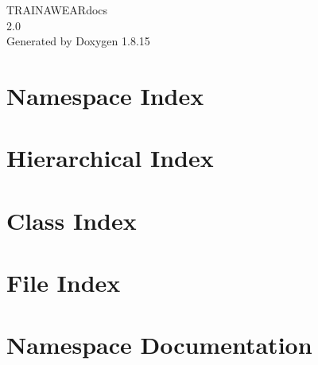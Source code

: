 \let\mypdfximage\pdfximage\def\pdfximage{\immediate\mypdfximage}\documentclass[twoside]{book}
\newcommand{\+}{\discretionary{\mbox{\scriptsize$\hookleftarrow$}}{}{}}
\newcommand{\clearemptydoublepage}{%
  \newpage{\pagestyle{empty}\cleardoublepage}%
}
\begin{document}
\hypersetup{pageanchor=false,
             bookmarksnumbered=true,
             pdfencoding=unicode
            }
\begin{titlepage}
\vspace*{7cm}
\begin{center}%
{\Large T\+R\+A\+I\+N\+A\+W\+E\+A\+Rdocs \\[1ex]\large 2.\+0 }\\
\vspace*{1cm}
{\large Generated by Doxygen 1.8.15}\\
\end{center}
\end{titlepage}
\clearemptydoublepage
{}
\tableofcontents
\clearemptydoublepage
{}
\hypersetup{pageanchor=true}

\chapter{Namespace Index}

\chapter{Hierarchical Index}

\chapter{Class Index}

\chapter{File Index}

\chapter{Namespace Documentation}






























\end{document}
